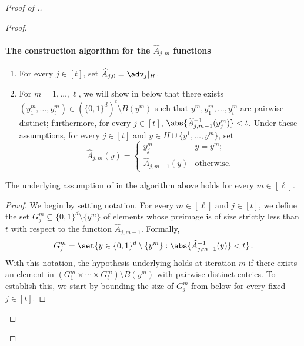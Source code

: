 \begin{proof}[Proof of .]
\begin{proof}
\paragraph{The construction algorithm for the $\widehat{A}_{j,m}$ functions}
\begin{enumerate}
  	\item\label{it:assump1} For every $j \in [t]$, set $\widehat{A}_{j,0} = \adv_{j}|_{H}$. 
%
  	\item\label{it:assump2} For $m = 1,\ldots, \ell$, we will show in  below that there exists $(y^m_{1},\ldots,y^m_{t})\in (\{0,1\}^d)^t \setminus B(y^m)$ such that $y^m, y^m_{1},\ldots,y^m_{t}$ are pairwise distinct; furthermore, for every $j \in [t]$, $\abs{\widehat{A}_{j,m-1}^{-1}(y^m_{j})} < t$. Under these assumptions, for every $j \in [t]$ and $y \in H \cup \{y^1,\ldots, y^m\}$, set 
  	\[\widehat{A}_{j,m}(y) = \begin{cases}
  	y^m_{j} &  y = y^m; \\
  	\widehat{A}_{j,m-1}(y) & \text{otherwise}.
  	\end{cases}\]



\end{enumerate}

\begin{claim}\label{c:step 2}
	The underlying assumption of  in the algorithm above holds for every $m \in [\ell]$.
\end{claim}

\begin{proof}
We begin by setting  notation.
For every $m \in [\ell]$ and $j \in [t]$, we define the set $G_j^m \subseteq \{0,1\}^d \setminus \{ y^m\}$ of elements whose preimage is of size strictly less than $t$ with respect to the function $\widehat{A}_{j,m-1}$. Formally,
\[G_j^m = \set{y \in \{0,1\}^d \setminus \{ y^m\} : \abs{{\widehat{A}_{j,m-1}}^{-1}(y)} < t}\,.\]
With this notation, the hypothesis underlying  holds at iteration $m$ if there exists an element in $(G_1^m \times \cdots \times G_t^m) \setminus B(y^m)$ with pairwise distinct entries. To establish this, we start by bounding the size of $G_j^m$ from below for every fixed $j \in [t]$.


\end{proof}
\end{proof}
\end{proof}

